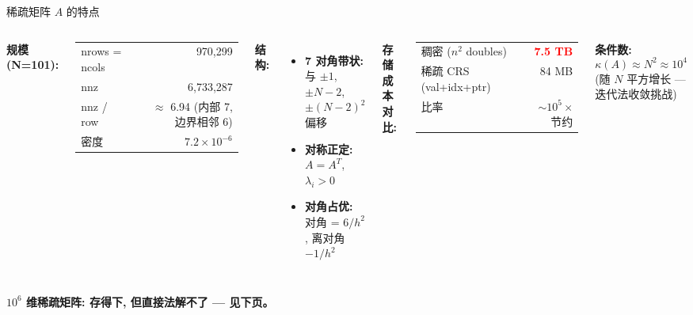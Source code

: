 \documentclass[12pt,aspectratio=169]{beamer}
\begin{document}
\begin{frame}[shrink]{稀疏矩阵 $A$ 的特点}

\begin{columns}[T]
\textbf{规模 (N=101):}
\renewcommand{\arraystretch}{1.1}
\begin{tabular}{@{}lr@{}}
\toprule
nrows = ncols & 970,299 \\
nnz           & 6,733,287 \\
nnz / row     & $\approx$ 6.94 (内部 7, 边界相邻 6) \\
密度          & $7.2 \times 10^{-6}$ \\
\bottomrule
\end{tabular}

\vspace{4pt}
\textbf{结构:}
\begin{itemize}\itemsep1pt
  \item \textbf{7 对角带状:} 与 $\pm 1$, $\pm N{-}2$, $\pm(N{-}2)^2$ 偏移
  \item \textbf{对称正定:} $A = A^T$, $\lambda_i > 0$
  \item \textbf{对角占优:} 对角 = $6/h^2$, 离对角 $-1/h^2$
\end{itemize}

\textbf{存储成本对比:}

\vspace{2pt}
\footnotesize
\begin{tabular}{@{}lr@{}}
\toprule
稠密 ($n^2$ doubles)    & \textcolor{red}{\textbf{7.5 TB}} \\
稀疏 CRS (val+idx+ptr) & 84 MB \\
比率                   & $\sim 10^5$\,$\times$ 节约 \\
\bottomrule
\end{tabular}

\vspace{6pt}
\normalsize
\textbf{条件数:}
\[
\kappa(A) \approx N^2 \approx 10^4
\]
\small (随 $N$ 平方增长 — 迭代法收敛挑战)
\end{columns}

\vspace{4pt}
\begin{center}
\textbf{$10^6$ 维稀疏矩阵: 存得下, 但直接法解不了 — 见下页。}
\end{center}
\end{frame}
\end{document}
